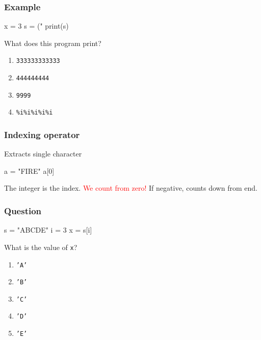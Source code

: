 \documentclass[11pt]{beamer}
\begin{document}
\begin{frame}[fragile]
  \frametitle{Example}
  \Enlarge

  \begin{semiverbatim}
x = 3
s = ("%
print(s)
  \end{semiverbatim}

  What does this program print?
  \begin{enumerate}[label=\Alph*]
  \item  \texttt{333333333333}
  \item  \texttt{444444444}
  \item  \texttt{9999}
  \item  \texttt{\%i\%i\%i\%i\%i}
  \end{enumerate}
\end{frame}

\begin{frame}[fragile]
  \frametitle{Indexing operator}
  \Enlarge

  \begin{itemize}
  \myitem  Extracts single character \pause
\begin{semiverbatim}
a = "FIRE"
a[0]
\end{semiverbatim} \pause
  \myitem  The integer is the index. \pause
  \myitem  \textcolor{red}{We count from zero!} \pause
  \myitem  If negative, counts down from end.
  \end{itemize}
\end{frame}

\begin{frame}[fragile]
  \frametitle{Question}
  \Enlarge

  \begin{semiverbatim}
s = "ABCDE"
i = 3
x = s[i]
  \end{semiverbatim}

  What is the value of \texttt{x}?
  \begin{enumerate}[label=\Alph*]
  \item  \texttt{'A'}
  \item  \texttt{'B'}
  \item  \texttt{'C'}
  \item  \texttt{'D'}
  \item  \texttt{'E'}
  \end{enumerate}
\end{frame}
\end{document}
